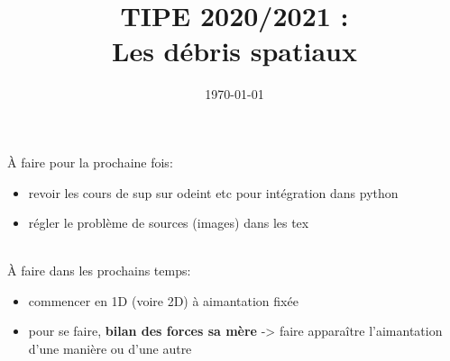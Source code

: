 \documentclass[a4paper,1pt]{article}
\title{TIPE 2020/2021 : \\ Les débris spatiaux}
\date{\today}
\begin{document}
 \maketitle
À faire pour la prochaine fois:
\begin{itemize}
    \item revoir les cours de sup sur odeint etc pour intégration dans python
    \item régler le problème de sources (images) dans les tex
\end{itemize}
~\\

À faire dans les prochains temps:
\begin{itemize}
    \item commencer en 1D (voire 2D) à aimantation fixée
    \item pour se faire, \textbf{bilan des forces sa mère} -> faire apparaître l'aimantation d'une manière ou d'une autre
\end{itemize}
\end{document}
